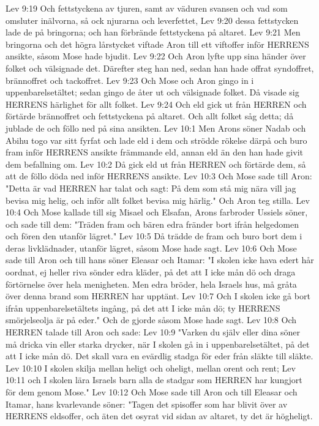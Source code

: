 Lev 9:19  Och fettstyckena av tjuren, samt av väduren svansen och vad som omsluter inälvorna, så ock njurarna och leverfettet,
Lev 9:20  dessa fettstycken lade de på bringorna; och han förbrände fettstyckena på altaret.
Lev 9:21  Men bringorna och det högra lårstycket viftade Aron till ett viftoffer inför HERRENS ansikte, såsom Mose hade bjudit.
Lev 9:22  Och Aron lyfte upp sina händer över folket och välsignade det. Därefter steg han ned, sedan han hade offrat syndoffret, brännoffret och tackoffret.
Lev 9:23  Och Mose och Aron gingo in i uppenbarelsetältet; sedan gingo de åter ut och välsignade folket. Då visade sig HERRENS härlighet för allt folket.
Lev 9:24  Och eld gick ut från HERREN och förtärde brännoffret och fettstyckena på altaret. Och allt folket såg detta; då jublade de och föllo ned på sina ansikten.
Lev 10:1  Men Arons söner Nadab och Abihu togo var sitt fyrfat och lade eld i dem och strödde rökelse därpå och buro fram inför HERRENS ansikte främmande eld, annan eld än den han hade givit dem befallning om.
Lev 10:2  Då gick eld ut från HERREN och förtärde dem, så att de föllo döda ned inför HERRENS ansikte.
Lev 10:3  Och Mose sade till Aron: "Detta är vad HERREN har talat och sagt: På dem som stå mig nära vill jag bevisa mig helig, och inför allt folket bevisa mig härlig." Och Aron teg stilla.
Lev 10:4  Och Mose kallade till sig Misael och Elsafan, Arons farbroder Ussiels söner, och sade till dem: "Träden fram och bären edra fränder bort ifrån helgedomen och fören den utanför lägret."
Lev 10:5  Då trädde de fram och buro bort dem i deras livklädnader, utanför lägret, såsom Mose hade sagt.
Lev 10:6  Och Mose sade till Aron och till hans söner Eleasar och Itamar: "I skolen icke hava edert hår oordnat, ej heller riva sönder edra kläder, på det att I icke mån dö och draga förtörnelse över hela menigheten. Men edra bröder, hela Israels hus, må gråta över denna brand som HERREN har upptänt.
Lev 10:7  Och I skolen icke gå bort ifrån uppenbarelsetältets ingång, på det att I icke mån dö; ty HERRENS smörjelseolja är på eder." Och de gjorde såsom Mose hade sagt.
Lev 10:8  Och HERREN talade till Aron och sade:
Lev 10:9  "Varken du själv eller dina söner må dricka vin eller starka drycker, när I skolen gå in i uppenbarelsetältet, på det att I icke mån dö. Det skall vara en evärdlig stadga för eder från släkte till släkte.
Lev 10:10  I skolen skilja mellan heligt och oheligt, mellan orent och rent;
Lev 10:11  och I skolen lära Israels barn alla de stadgar som HERREN har kungjort för dem genom Mose."
Lev 10:12  Och Mose sade till Aron och till Eleasar och Itamar, hans kvarlevande söner: "Tagen det spisoffer som har blivit över av HERRENS eldsoffer, och äten det osyrat vid sidan av altaret, ty det är högheligt.
